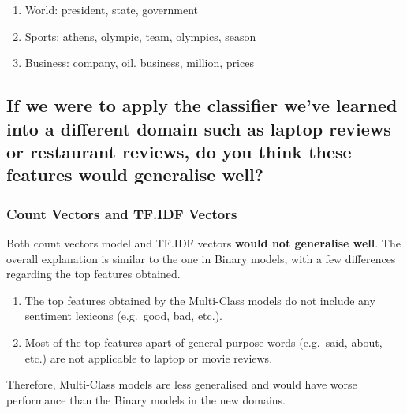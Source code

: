 \documentclass[11pt]{article}
\providecommand{\tightlist}{%
      \setlength{\itemsep}{0pt}\setlength{\parskip}{0pt}}
\begin{document}
\begin{enumerate}
\def\labelenumi{\arabic{enumi}.}
\tightlist
\item
  World: president, state, government
\item
  Sports: athens, olympic, team, olympics, season
\item
  Business: company, oil. business, million, prices
\end{enumerate}

    \hypertarget{if-we-were-to-apply-the-classifier-weve-learned-into-a-different-domain-such-as-laptop-reviews-or-restaurant-reviews-do-you-think-these-features-would-generalise-well}{%
\subsection{If we were to apply the classifier we've learned into a
different domain such as laptop reviews or restaurant reviews, do you
think these features would generalise
well?}\label{if-we-were-to-apply-the-classifier-weve-learned-into-a-different-domain-such-as-laptop-reviews-or-restaurant-reviews-do-you-think-these-features-would-generalise-well}}

\hypertarget{count-vectors-and-tf.idf-vectors}{%
\subsubsection{Count Vectors and TF.IDF
Vectors}\label{count-vectors-and-tf.idf-vectors}}

Both count vectors model and TF.IDF vectors \textbf{would not generalise
well}. The overall explanation is similar to the one in Binary models,
with a few differences regarding the top features obtained.

\begin{enumerate}
\def\labelenumi{\arabic{enumi}.}
\tightlist
\item
  The top features obtained by the Multi-Class models do not include any
  sentiment lexicons (e.g.~good, bad, etc.).
\item
  Most of the top features apart of general-purpose words (e.g.~said,
  about, etc.) are not applicable to laptop or movie reviews.
\end{enumerate}

Therefore, Multi-Class models are less generalised and would have worse
performance than the Binary models in the new domains.
\end{document}
